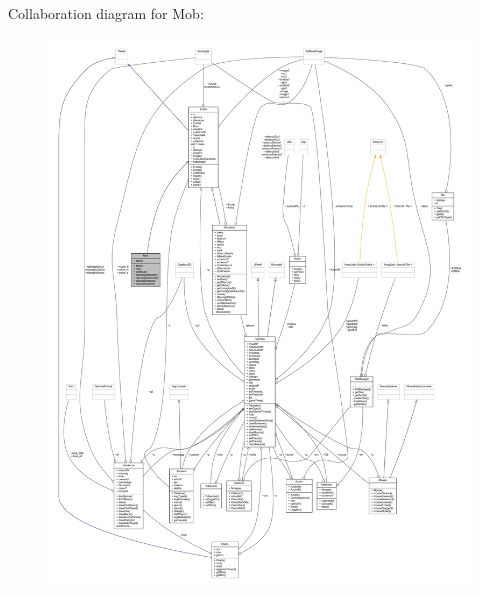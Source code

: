 Collaboration diagram for Mob\+:
\nopagebreak
\begin{figure}[H]
\begin{center}
\leavevmode
\includegraphics[width=350pt]{class_entita_1_1_mob__coll__graph}
\end{center}
\end{figure}
